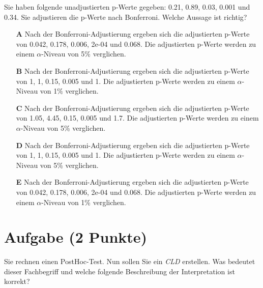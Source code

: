 \documentclass[a4paper, 9pt]{scrartcl}\usepackage[]{graphicx}\usepackage[]{xcolor}
\begin{document}
Sie haben folgende unadjustierten p-Werte gegeben: 0.21, 0.89, 0.03, 0.001 und 0.34. Sie adjustieren die p-Werte nach
Bonferroni. Welche Aussage ist richtig?



\begin{enumerate}
\item [\textbf{A} \msquare] Nach der Bonferroni-Adjustierung ergeben sich die adjustierten p-Werte von 0.042, 0.178, 0.006, 2e-04 und 0.068. Die adjustierten p-Werte werden zu einem $\alpha$-Niveau von 5\% verglichen.
\item [\textbf{B} \msquare] Nach der Bonferroni-Adjustierung ergeben sich die adjustierten p-Werte von 1, 1, 0.15, 0.005 und 1. Die adjustierten p-Werte werden zu einem $\alpha$-Niveau von 1\% verglichen.
\item [\textbf{C} \msquare] Nach der Bonferroni-Adjustierung ergeben sich die adjustierten p-Werte von 1.05, 4.45, 0.15, 0.005 und 1.7. Die adjustierten p-Werte werden zu einem $\alpha$-Niveau von 5\% verglichen.
\item [\textbf{D} \msquare] Nach der Bonferroni-Adjustierung ergeben sich die adjustierten p-Werte von 1, 1, 0.15, 0.005 und 1. Die adjustierten p-Werte werden zu einem $\alpha$-Niveau von 5\% verglichen.
\item [\textbf{E} \msquare] Nach der Bonferroni-Adjustierung ergeben sich die adjustierten p-Werte von 0.042, 0.178, 0.006, 2e-04 und 0.068. Die adjustierten p-Werte werden zu einem $\alpha$-Niveau von 1\% verglichen.
\end{enumerate}

\section{Aufgabe \hfill (2 Punkte)}



Sie rechnen einen PostHoc-Test. Nun sollen Sie ein \textit{CLD} erstellen. Was bedeutet dieser Fachbegriff und welche folgende Beschreibung der Interpretation ist korrekt?
\end{document}
